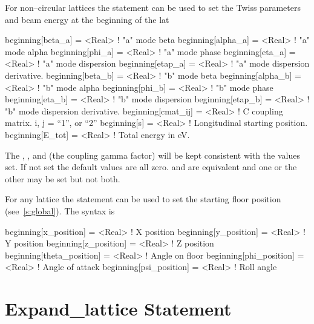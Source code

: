 For non--circular lattices the  statement can be used to
set the Twiss parameters and beam energy at the beginning of the lat
\begin{example}
  beginning[beta_a]  = <Real>  ! "a" mode beta
  beginning[alpha_a] = <Real>  ! "a" mode alpha
  beginning[phi_a]   = <Real>  ! "a" mode phase
  beginning[eta_a]   = <Real>  ! "a" mode dispersion
  beginning[etap_a]  = <Real>  ! "a" mode dispersion derivative.
  beginning[beta_b]  = <Real>  ! "b" mode beta
  beginning[alpha_b] = <Real>  ! "b" mode alpha
  beginning[phi_b]   = <Real>  ! "b" mode phase
  beginning[eta_b]   = <Real>  ! "b" mode dispersion
  beginning[etap_b]  = <Real>  ! "b" mode dispersion derivative.
  beginning[cmat_ij] = <Real>  ! C coupling matrix. i, j = {``1'', or ``2''} 
  beginning[s]       = <Real>  ! Longitudinal starting position.
  beginning[E_tot] = <Real>  ! Total energy in eV.
\end{example}
The , , and  (the coupling gamma
factor) will be kept consistent with the values set. If not set the
default values are all zero.   and
 are equivalent and one or the other may be
set but not both.

For any lattice the  statement can be used to set the starting floor position 
(see~\ref{s:global}). The syntax is
\begin{example}
  beginning[x_position]     = <Real>  ! X position
  beginning[y_position]     = <Real>  ! Y position
  beginning[z_position]     = <Real>  ! Z position
  beginning[theta_position] = <Real>  ! Angle on floor
  beginning[phi_position]   = <Real>  ! Angle of attack
  beginning[psi_position]   = <Real>  ! Roll angle
\end{example}

\section{Expand_lattice Statement}
\label{s:expand}

